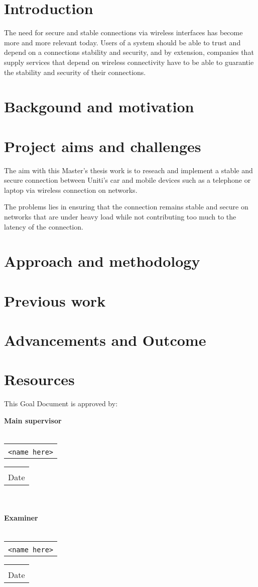 \documentclass[a4paper]{article}
\makeatletter
\newcommand{\signature}[2]{%
	\noindent%
	\textbf{{#1}}\\\\
	\begin{tabular}{@{}p{2.5in}@{}}
		\\ \hline \\[-.75\normalbaselineskip]
		\texttt{{#2}}
	\end{tabular} \hspace{0in}
	\begin{tabular}{@{}p{2.5in}@{}}
		\\ \hline \\[-.75\normalbaselineskip]
		Date
	\end{tabular}\\
}
\makeatother
\begin{document}
\section{Introduction}
The need for secure and stable connections via wireless interfaces has become
more and more relevant today. Users of a system should be able to trust and
depend on a connections stability and security, and by extension, companies that
supply services that depend on wireless connectivity have to be able to
guarantie the stability and security of their connections.


\section{Backgound and motivation}




\section{Project aims and challenges}

The aim with this Master's thesis work is to reseach and implement a stable and
secure connection between Uniti's car and mobile devices such as a telephone or
laptop via wireless connection on networks.

The problems lies in ensuring that the connection remains stable and secure on
networks that are under heavy load while not contributing too much to the
latency of the connection.

\section{Approach and methodology}



\section{Previous work}


\section{Advancements and Outcome}


\section{Resources}


This Goal Document is approved by:

\signature{Main supervisor}{<name here>}\\

\signature{Examiner}{<name here>}
\end{document}
